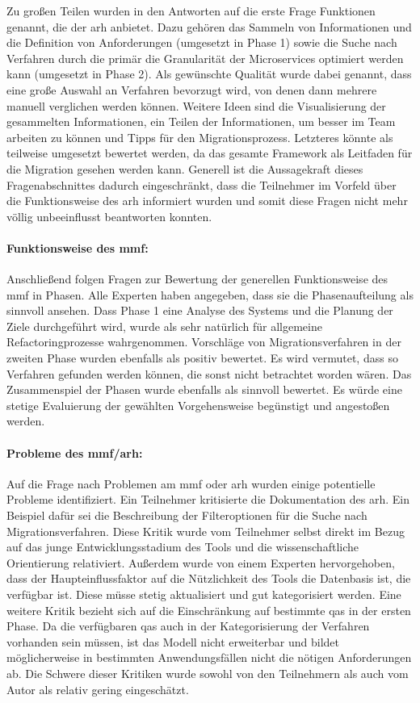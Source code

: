 Zu großen Teilen wurden in den Antworten auf die erste Frage Funktionen genannt, die der \gls{arh} anbietet.
Dazu gehören das Sammeln von Informationen und die Definition von Anforderungen (umgesetzt in Phase 1)  sowie die Suche nach Verfahren durch die primär die Granularität der Microservices optimiert werden kann (umgesetzt in Phase 2).
Als gewünschte Qualität wurde dabei genannt, dass eine große Auswahl an Verfahren bevorzugt wird, von denen dann mehrere manuell verglichen werden können.
Weitere Ideen sind die Visualisierung der gesammelten Informationen, ein Teilen der Informationen, um besser im Team arbeiten zu können und Tipps für den Migrationsprozess.
Letzteres könnte als teilweise umgesetzt bewertet werden, da das gesamte Framework als Leitfaden für die Migration gesehen werden kann.
Generell ist die Aussagekraft dieses Fragenabschnittes dadurch eingeschränkt, dass die Teilnehmer im Vorfeld über die Funktionsweise des \gls{arh} informiert wurden und somit diese Fragen nicht mehr völlig unbeeinflusst beantworten konnten.

\paragraph{Funktionsweise des \gls{mmf}:} Anschließend folgen Fragen zur Bewertung der generellen Funk\-ti\-ons\-wei\-se des \gls{mmf} in Phasen.
Alle Experten haben angegeben, dass sie die Phasenaufteilung als sinnvoll ansehen.
Dass Phase 1 eine Analyse des Systems und die Planung der Ziele durchgeführt wird, wurde als sehr natürlich für allgemeine Refactoringprozesse wahrgenommen.
Vorschläge von Migrationsverfahren in der zweiten Phase wurden ebenfalls als positiv bewertet.
Es wird vermutet, dass so Verfahren gefunden werden können, die sonst nicht betrachtet worden wären.
Das Zusammenspiel der Phasen wurde ebenfalls als sinnvoll bewertet.
Es würde eine stetige Evaluierung der gewählten Vorgehensweise begünstigt und angestoßen werden.

\paragraph{Probleme des \gls{mmf}/\gls{arh}:} Auf die Frage nach Problemen am \gls{mmf} oder \gls{arh} wurden einige potentielle Probleme identifiziert.
Ein Teilnehmer kritisierte die Dokumentation des \gls{arh}.
Ein Beispiel dafür sei die Beschreibung der Filteroptionen für die Suche nach Migrationsverfahren.
Diese Kritik wurde vom Teilnehmer selbst direkt im Bezug auf das junge Entwicklungsstadium des Tools und die wissenschaftliche Orientierung relativiert.
Außerdem wurde von einem Experten hervorgehoben, dass der Haupteinflussfaktor auf die Nützlichkeit des Tools die Datenbasis ist, die verfügbar ist.
Diese müsse stetig aktualisiert und gut kategorisiert werden.
Eine weitere Kritik bezieht sich auf die Einschränkung auf bestimmte \glspl{qa} in der ersten Phase.
Da die verfügbaren \glspl{qa} auch in der Kategorisierung der Verfahren vorhanden sein müssen, ist das Modell nicht erweiterbar und bildet möglicherweise in bestimmten Anwendungsfällen nicht die nötigen Anforderungen ab.
Die Schwere dieser Kritiken wurde sowohl von den Teilnehmern als auch vom Autor als relativ gering eingeschätzt.

